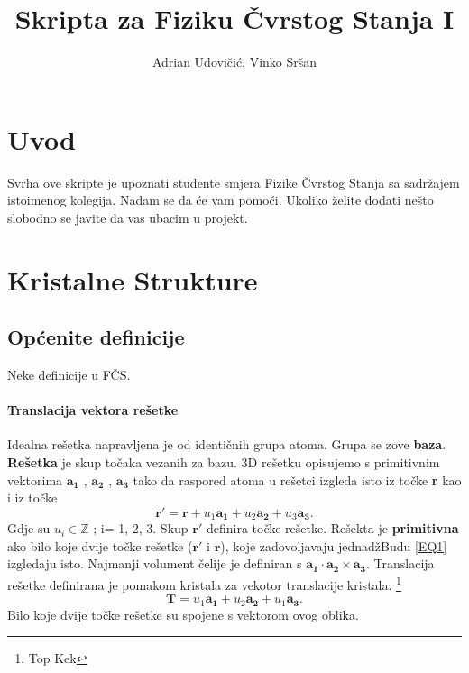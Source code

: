 \documentclass{article}
\title{Skripta za Fiziku Čvrstog Stanja I}
\author{Adrian Udovičić, Vinko Sršan}
\numberwithin{equation}{section}
\begin{document}
\maketitle
{}
\section*{\centering Uvod}

Svrha ove skripte je upoznati studente smjera Fizike Čvrstog Stanja sa sadržajem istoimenog kolegija. Nadam se da će vam pomoći. Ukoliko želite dodati nešto slobodno se javite da vas ubacim u projekt.

\vfill

\begin{center}
\tableofcontents
\end{center}
\vfill
\newpage
\section{Kristalne Strukture}
\subsection{Općenite definicije}
Neke definicije u FČS.
\paragraph{Translacija vektora rešetke}
Idealna rešetka napravljena je od identičnih grupa atoma. Grupa se zove \textbf{baza}. \textbf{Rešetka} je skup točaka vezanih za bazu. 3D rešetku opisujemo s primitivnim vektorima $\mathbf{a_1}$ , $\mathbf{a_2}$ , $\mathbf{a_3}$  tako da raspored atoma u rešetci izgleda isto iz točke \textbf{r} kao i iz točke  
\begin{equation}
    \mathbf{r'} =  \mathbf{r} + u_1 \mathbf{a_1} + u_2 \mathbf{a_2} + u_3 \mathbf{a_3}. \label{EQ1}
\end{equation}
Gdje su $u_i \in \mathbb{Z}$ ; i= 1, 2, 3. Skup $\mathbf{r'}$ definira točke rešetke. 
Rešekta je \textbf{primitivna} ako bilo koje dvije točke rešetke ($\mathbf{r'}$ i $\mathbf{r}$), koje zadovoljavaju jednadžBudu 
\ref{EQ1} izgledaju isto. Najmanji volument čelije je definiran s $\mathbf{a_1} \cdot \mathbf{a_2} \times \mathbf{a_3}$. 
Translacija rešetke definirana je pomakom kristala za vekotor translacije kristala. \footnote{Top Kek} 
\begin{equation}
    \mathbf{T}=u_1\mathbf{a_1}+u_2\mathbf{a_2}+u_1\mathbf{a_3}.
    \label{EQ2}
\end{equation}
Bilo  koje dvije točke rešetke su spojene s vektorom ovog oblika. 
\end{document}
